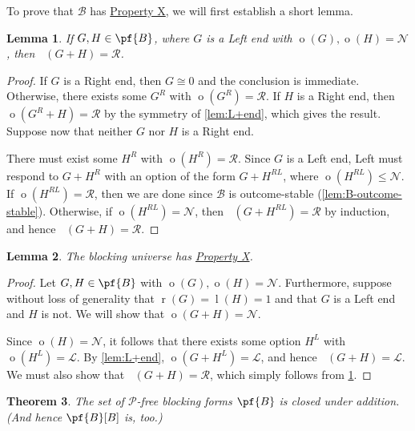 \documentclass[11pt]{article}
\newtheorem{theorem}{Theorem}[section]
\newtheorem{lemma}[theorem]{Lemma}
\theoremstyle{definition}
\DeclareMathOperator{\outcome}{o}
\DeclareMathOperator{\outcomeL}{o_L}
\DeclareMathOperator{\outcomeR}{o_R}
\newcommand{\set}[1]{\mathcal{#1}}
\DeclareMathOperator{\ltp}{l}
\DeclareMathOperator{\rtp}{r}
\begin{document}
To prove that $\set{B}$ has \hyperlink{prop:X}{Property X}, we will first
establish a short lemma.

\begin{lemma}
    \label{lem:left-end-plus-N}
    If $G,H\in\pf{B}$, where $G$ is a Left end with
    $\outcome(G),\outcome(H)=\mathscr{N}$, then $\outcomeR(G+H)=\mathscr{R}$.
\end{lemma}

\begin{proof}
    If $G$ is a Right end, then $G\cong0$ and the conclusion is immediate.
    Otherwise, there exists some $G^R$ with $\outcome(G^R)=\mathscr{R}$. If $H$
    is a Right end, then $\outcome(G^R+H)=\mathscr{R}$ by the symmetry of
    \cref{lem:L+end}, which gives the result. Suppose now that neither $G$ nor
    $H$ is a Right end.

    There must exist some $H^R$ with $\outcome(H^R)=\mathscr{R}$. Since $G$ is
    a Left end, Left must respond to $G+H^R$ with an option of the form
    $G+H^{RL}$, where $\outcome(H^{RL})\leq\mathscr{N}$. If
    $\outcome(H^{RL})=\mathscr{R}$, then we are done since $\set{B}$ is
    outcome-stable (\cref{lem:B-outcome-stable}). Otherwise, if
    $\outcome(H^{RL})=\mathscr{N}$, then $\outcomeR(G+H^{RL})=\mathscr{R}$ by
    induction, and hence $\outcomeR(G+H)=\mathscr{R}$.
\end{proof}

\begin{lemma}
    \label{lem:B-prop-X}
    The blocking universe has \hyperlink{prop:X}{Property X}.
\end{lemma}

\begin{proof}
    Let $G,H\in\pf{B}$ with $\outcome(G),\outcome(H)=\mathscr{N}$. Furthermore,
    suppose without loss of generality that $\rtp(G)=\ltp(H)=1$ and that $G$ is
    a Left end and $H$ is not. We will show that $\outcome(G+H)=\mathscr{N}$.

    Since $\outcome(H)=\mathscr{N}$, it follows that there exists some option
    $H^L$ with $\outcome(H^L)=\mathscr{L}$. By \cref{lem:L+end},
    $\outcome(G+H^L)=\mathscr{L}$, and hence $\outcomeL(G+H)=\mathscr{L}$. We
    must also show that $\outcomeR(G+H)=\mathscr{R}$, which simply follows from
    \cref{lem:left-end-plus-N}.
\end{proof}

\begin{theorem}
    \label{cor:B-pfree-closed}
    The set of $\mathscr{P}$-free blocking forms $\pf{B}$ is closed under
    addition. (And hence $\pf{B}[B]$ is, too.)
\end{theorem}
\end{document}
